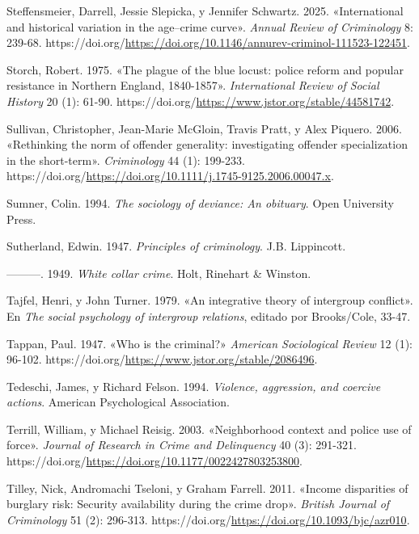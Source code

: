\documentclass[
  spanish,
  letterpaper,
  DIV=11,
  numbers=noendperiod]{scrreprt}
\newlength{\cslhangindent}
\newenvironment{CSLReferences}[2] %
 {\begin{list}{}{%
  \setlength{\itemindent}{0pt}
  \setlength{\leftmargin}{0pt}
  \setlength{\parsep}{0pt}
  \ifodd #1
   \setlength{\leftmargin}{\cslhangindent}
   \setlength{\itemindent}{-1\cslhangindent}
  \fi
  \setlength{\itemsep}{#2\baselineskip}}}
 {\end{list}}
\begin{document}
\begin{CSLReferences}{1}{0}
Steffensmeier, Darrell, Jessie Slepicka, y Jennifer Schwartz. 2025.
{«International and historical variation in the age--crime curve»}.
\emph{Annual Review of Criminology} 8: 239-68.
https://doi.org/\url{https://doi.org/10.1146/annurev-criminol-111523-122451}.

Storch, Robert. 1975. {«The plague of the blue locust: police reform and
popular resistance in Northern England, 1840-1857»}. \emph{International
Review of Social History} 20 (1): 61-90.
https://doi.org/\url{https://www.jstor.org/stable/44581742}.

Sullivan, Christopher, Jean-Marie McGloin, Travis Pratt, y Alex Piquero.
2006. {«Rethinking the norm of offender generality: investigating
offender specialization in the short-term»}. \emph{Criminology} 44 (1):
199-233.
https://doi.org/\url{https://doi.org/10.1111/j.1745-9125.2006.00047.x}.

Sumner, Colin. 1994. \emph{The sociology of deviance: An obituary}. Open
University Press.

Sutherland, Edwin. 1947. \emph{Principles of criminology}. J.B.
Lippincott.

---------. 1949. \emph{White collar crime}. Holt, Rinehart \& Winston.

Tajfel, Henri, y John Turner. 1979. {«An integrative theory of
intergroup conflict»}. En \emph{The social psychology of intergroup
relations}, editado por Brooks/Cole, 33-47.

Tappan, Paul. 1947. {«Who is the criminal?»} \emph{American Sociological
Review} 12 (1): 96-102.
https://doi.org/\url{https://www.jstor.org/stable/2086496}.

Tedeschi, James, y Richard Felson. 1994. \emph{Violence, aggression, and
coercive actions}. American Psychological Association.

Terrill, William, y Michael Reisig. 2003. {«Neighborhood context and
police use of force»}. \emph{Journal of Research in Crime and
Delinquency} 40 (3): 291-321.
https://doi.org/\url{https://doi.org/10.1177/0022427803253800}.

Tilley, Nick, Andromachi Tseloni, y Graham Farrell. 2011. {«Income
disparities of burglary risk: Security availability during the crime
drop»}. \emph{British Journal of Criminology} 51 (2): 296-313.
https://doi.org/\url{https://doi.org/10.1093/bjc/azr010}.


\end{CSLReferences}
\end{document}
